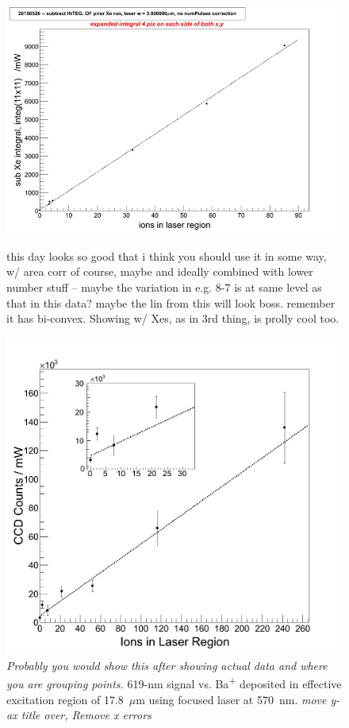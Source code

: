 \begin{figure}
                ~
                \includegraphics[width=.5\textwidth]{figures/lin_20150526_cut.png}
                \caption{\color{gray}this day looks so good that i think you should use it in some way, w/ area corr of course, maybe and ideally combined with lower number stuff -- maybe the variation in e.g. 8-7 is at same level as that in this data? maybe the lin from this will look boss.  remember it has bi-convex.  Showing w/ Xes, as in 3rd thing, is prolly cool too.}
\label{fig:lintemp}
\end{figure}

\begin{figure} %
        \centering
                \includegraphics[width=.99\textwidth]{figures/lin_corr_20151016.png}
                \caption{\emph{\color{gray}Probably you would show this after showing actual data and where you are grouping points.}  619-nm signal vs. Ba\textsuperscript{+} deposited in effective excitation region of 17.8~$\mu$m using focused laser at 570~nm. \emph{\color{gray}move y-ax title over, Remove x errors}}
\label{fig:lin}
\end{figure}

